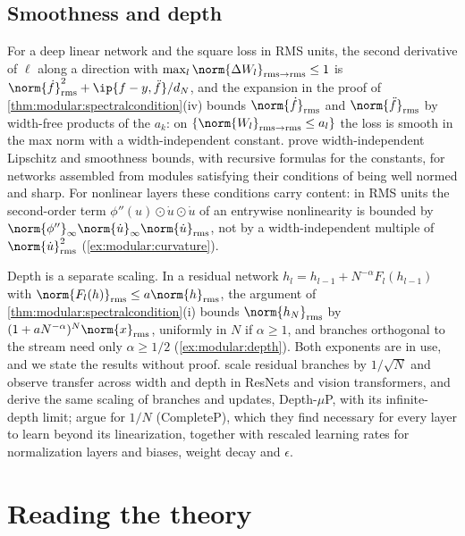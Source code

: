 \begin{refsection}
\subsection{Smoothness and depth}

For a deep linear network and the square loss in RMS units, the second derivative of $\ell$ along a direction with $\max_l\norm{\Delta W_l}_{\rms\to\rms}\le1$ is $\norm{\dot f}^2_\rms+\ip{f-y,\ddot f}/d_N$, and the expansion in the proof of \cref{thm:modular:spectralcondition}(iv) bounds $\norm{\dot f}_\rms$ and $\norm{\ddot f}_\rms$ by width-free products of the $a_k$: on $\{\norm{W_l}_{\rms\to\rms}\le a_l\}$ the loss is smooth in the max norm with a width-independent constant. \Textcite{LargeEtAl2024} prove width-independent Lipschitz and smoothness bounds, with recursive formulas for the constants, for networks assembled from modules satisfying their conditions of being well normed and sharp. For nonlinear layers these conditions carry content: in RMS units the second-order term $\phi''(u)\odot\dot u\odot\dot u$ of an entrywise nonlinearity is bounded by $\norm{\phi''}_\infty\norm{\dot u}_\infty\norm{\dot u}_\rms$, not by a width-independent multiple of $\norm{\dot u}_\rms^2$ (\cref{ex:modular:curvature}).

Depth is a separate scaling. In a residual network $h_l=h_{l-1}+N^{-\alpha}F_l(h_{l-1})$ with $\norm{F_l(h)}_\rms\le a\norm{h}_\rms$, the argument of \cref{thm:modular:spectralcondition}(i) bounds $\norm{h_N}_\rms$ by $(1+aN^{-\alpha})^N\norm{x}_\rms$, uniformly in $N$ if $\alpha\ge1$, and branches orthogonal to the stream need only $\alpha\ge1/2$ (\cref{ex:modular:depth}). Both exponents are in use, and we state the results without proof. \Textcite{BordelonEtAl2024} scale residual branches by $1/\sqrt N$ and observe transfer across width and depth in ResNets and vision transformers, and \textcite{YangEtAl2024} derive the same scaling of branches and updates, Depth-$\mu$P, with its infinite-depth limit; \textcite{DeyEtAl2025} argue for $1/N$ (CompleteP), which they find necessary for every layer to learn beyond its linearization, together with rescaled learning rates for normalization layers and biases, weight decay and $\epsilon$.

\section{Reading the theory}\label{sec:modular:reading}


\end{refsection}
